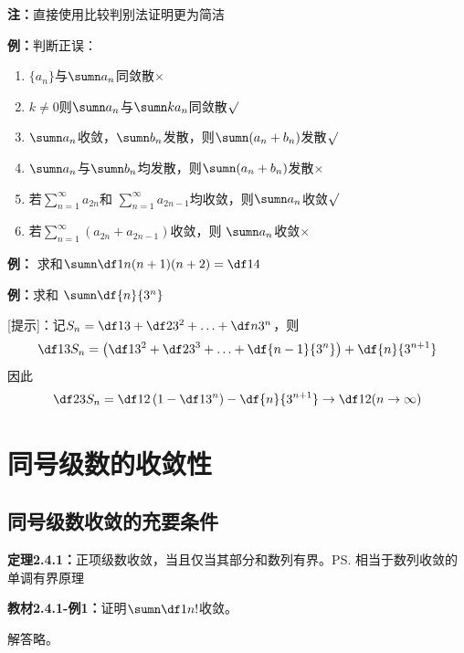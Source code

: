 % 

{\bf 注：}直接使用比较判别法证明更为简洁

{\bf 例：}判断正误：
\begin{enumerate}[(1)]
  \setlength{\itemindent}{1cm}
  \item $\{a_n\}$与$\sumn a_n$同敛散\hfill$\times$
  \item $k\ne 0$则$\sumn a_n$与$\sumn ka_n$同敛散\hfill$\surd$
  \item $\sumn a_n$收敛，$\sumn b_n$发散，则$\sumn(a_n+b_n)$发散\hfill$\surd$
  \item $\sumn a_n$与$\sumn b_n$均发散，则$\sumn(a_n+b_n)$发散\hfill$\times$
  \item 若$\sum\limits_{n=1}^{\infty}a_{2n}$和
  $\sum\limits_{n=1}^{\infty}a_{2n-1}$均收敛，则$\sumn a_n$收敛\hfill$\surd$
  \item 若$\sum\limits_{n=1}^{\infty}(a_{2n}+a_{2n-1})$收敛，则
  $\sumn a_n$收敛\hfill$\times$
\end{enumerate}

{\bf 例：} 求和$\sumn\df1{n(n+1)(n+2)}=\df14$

{\bf 例：}求和 $\sumn\df{n}{3^n}$

[提示]：记$S_n=\df13+\df2{3^2}+\ldots+\df n{3^n}$，则
$$\df13S_n=\left(\df1{3^2}+\df2{3^3}+\ldots
+\df{n-1}{3^n}\right)+\df{n}{3^{n+1}}$$
因此
$$\df23S_n=\df12\left(1-\df1{3^n}\right)-\df{n}{3^{n+1}}\to\df12
(n\to\infty)$$

\section{同号级数的收敛性}

\subsection{同号级数收敛的充要条件}

{\bf 定理2.4.1：}正项级数收敛，当且仅当其部分和数列有界。\ps{相当于数列收敛的单调有界原理}

{\bf 教材2.4.1-例1：}证明$\sumn\df1{n!}$收敛。

解答略。

